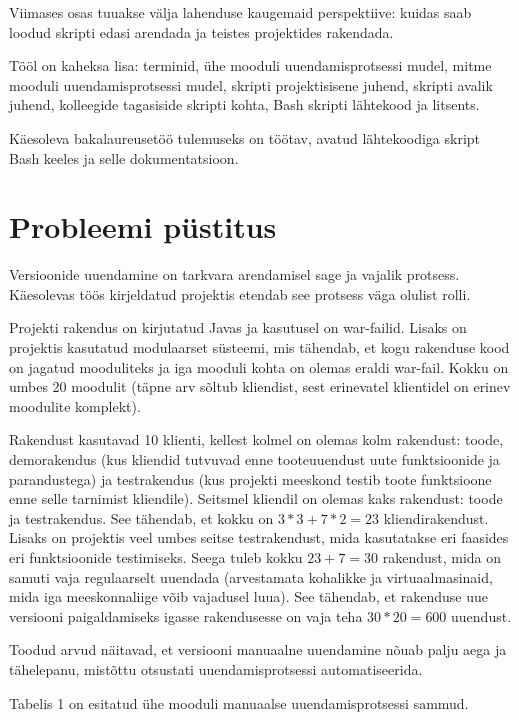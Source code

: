 \documentclass[12pt]{article}
\begin{document}
  Viimases osas tuuakse välja lahenduse kaugemaid perspektiive: kuidas saab loodud skripti edasi arendada ja teistes projektides rakendada.
  
  Tööl on kaheksa lisa: terminid, ühe mooduli uuendamisprotsessi mudel, mitme mooduli uuendamisprotsessi mudel, skripti projektisisene juhend, skripti avalik juhend, kolleegide tagasiside skripti kohta, Bash skripti lähtekood ja litsents.
  
  Käesoleva bakalaureusetöö tulemuseks on töötav, avatud lähtekoodiga skript Bash keeles ja selle dokumentatsioon.
  
  \newpage
  
  \section{Probleemi püstitus}
  
  Versioonide uuendamine on tarkvara arendamisel sage ja vajalik protsess. Käes\-olevas töös kirjeldatud projektis etendab see protsess väga olulist rolli.
  
  Projekti rakendus on kirjutatud Javas ja kasutusel on war\--failid. Lisaks on projektis kasutatud modulaarset süsteemi, mis tähendab, et kogu rakenduse kood on jagatud mooduliteks ja iga mooduli kohta on olemas eraldi war\--fail. Kokku on umbes 20 moodulit (täpne arv sõltub kliendist, sest erinevatel klientidel on erinev moodulite komplekt).
  
  Rakendust kasutavad 10 klienti, kellest kolmel on olemas kolm rakendust: toode, demorakendus (kus kliendid tutvuvad enne tooteuuendust uute funktsioonide ja parandustega) ja testrakendus (kus projekti meeskond testib toote funktsioone enne selle tarnimist kliendile). Seitsmel kliendil on olemas kaks rakendust: toode ja testrakendus. See tähendab, et kokku on $3*3+7*2=23$ kliendirakendust. Lisaks on projektis veel umbes seitse testrakendust, mida kasutatakse eri faasides eri funktsioonide testimiseks. Seega tuleb kokku $23+7=30$ rakendust, mida on samuti vaja regulaarselt uuendada (arvestamata kohalikke ja virtuaalmasinaid, mida iga meeskonnaliige võib vajadusel luua). See tähendab, et rakenduse uue versiooni paigaldamiseks igasse rakendusesse on vaja teha $30*20=600$ uuendust.
  
  Toodud arvud näitavad, et versiooni manuaalne uuendamine nõuab palju aega ja tähelepanu, mistõttu otsustati uuendamisprotsessi automatiseerida.
    
  Tabelis 1 on esitatud ühe mooduli manuaalse uuendamisprotsessi sammud.
  
\end{document}
